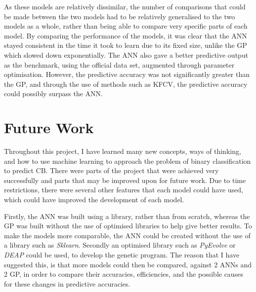 \documentclass[11pt]{article}
\begin{document}
As these models are relatively dissimilar, the number of comparisons that could be made between the two models had to be relatively generalised to the two models as a whole, rather than being able to compare very specific parts of each model. By comparing the performance of the models, it was clear that the ANN stayed consistent in the time it took to learn due to its fixed size, unlike the GP which slowed down exponentially. The ANN also gave a better predictive output as the benchmark, using the official data set, augmented through parameter optimisation. However, the predictive accuracy was not significantly greater than the GP, and through the use of methods such as KFCV, the predictive accuracy could possibly surpass the ANN. 
\section{Future Work}\label{sec:FWC}
Throughout this project, I have learned many new concepts, ways of thinking, and how to use machine learning to approach the problem of binary classification to predict CB. There were parts of the project that were achieved very successfully and parts that may be improved upon for future work.  Due to time restrictions, there were several other features that each model could have used, which could have improved the development of each model.

Firstly, the ANN was built using a library, rather than from scratch, whereas the GP was built without the use of optimised libraries to help give better results. To make the models more comparable, the ANN could be created without the use of a library such as \textit{Sklearn}. Secondly an optimised library such as \textit{PyEvolve} or \textit{DEAP} could be used, to develop the genetic program. The reason that I have suggested this, is that more models could then be compared, against 2 ANNs and 2 GP, in order to compare their accuracies, efficiencies, and the possible causes for these changes in predictive accuracies. 
\end{document}
